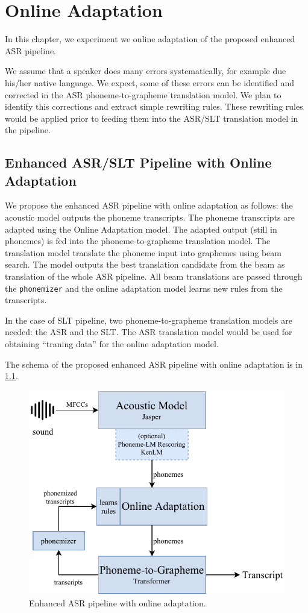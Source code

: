 \chapter{Online Adaptation}
\label{chap:adaptation}
In this chapter, we experiment we online adaptation of the proposed enhanced ASR pipeline.

We assume that a speaker does many errors systematically, for example due his/her native language. We expect, some of these errors can be identified and corrected in the ASR phoneme-to-grapheme translation model. We plan to identify this corrections and extract simple rewriting rules. These rewriting rules would be applied prior to feeding them into the ASR/SLT translation model in the pipeline.


\section{Enhanced ASR/SLT Pipeline with Online Adaptation}
\label{oeasr:model}
We propose the enhanced ASR pipeline with online adaptation as follows: the acoustic model outputs the phoneme transcripts. The phoneme transcripts are adapted using the Online Adaptation model. The adapted output (still in phonemes) is fed into the phoneme-to-grapheme translation model. The translation model translate the phoneme input into graphemes using beam search. The model outputs the best translation candidate from the beam as translation of the whole ASR pipeline. All beam translations are passed through the \texttt{phonemizer} and the online adaptation model learns new rules from the transcripts.

In the case of SLT pipeline, two phoneme-to-grapheme translation models are needed: the ASR and the SLT. The ASR translation model would be used for obtaining ``traning data'' for the online adaptation model.

The schema of the proposed enhanced ASR pipeline with online adaptation is in \cref{fig:online_easr}.

\begin{figure}[t]
	\centering
	\includegraphics[width=.9\textwidth]{img/online_easr}
	\caption{Enhanced ASR pipeline with online adaptation.}
	\label{fig:online_easr}
\end{figure} 


